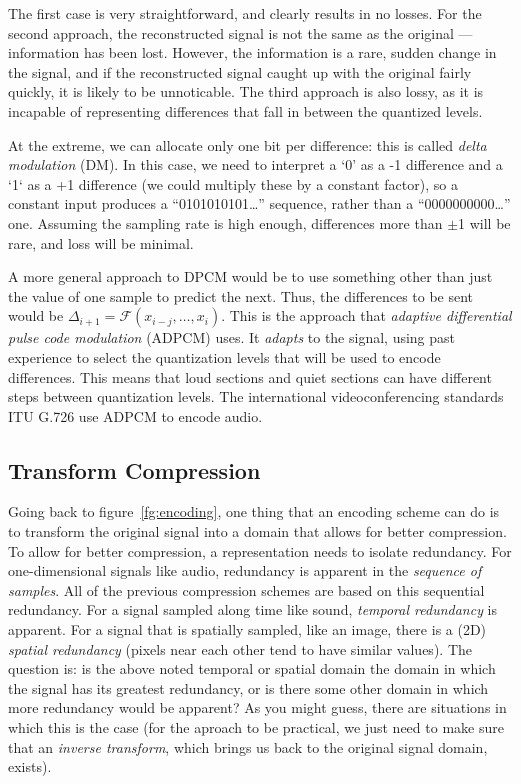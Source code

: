 The first case is very straightforward, and clearly results in no
losses.  For the second approach, the reconstructed signal is not the
same as the original --- information has been lost. However, the
information is a rare, sudden change in the signal, and if the
reconstructed signal caught up with the original fairly quickly, it is
likely to be unnoticable. The third approach is also lossy, as it is
incapable of representing differences that fall in between the
quantized levels.

At the extreme, we can allocate only one bit per difference: this is
called \emph{delta modulation} (DM).  In this case, we need to
interpret a `0' as a -1 difference and a `1` as a +1 difference (we
could multiply these by a constant factor), so a constant input
produces a ``0101010101\ldots'' sequence, rather than a
``0000000000\ldots'' one.  Assuming the sampling rate is high enough,
differences more than $\pm$1 will be rare, and loss will be minimal.

A more general approach to DPCM would be to use something other than
just the value of one sample to predict the next. Thus, the
differences to be sent would be $\Delta_{i+1} = \mathcal{F}(x_{i-j},
\ldots, x_i)$.  This is the approach that \emph{adaptive differential
pulse code modulation} (ADPCM) uses.  It \emph{adapts} to the signal,
using past experience to select the quantization levels that will be
used to encode differences.  This means that loud sections and quiet
sections can have different steps between quantization levels.  The
international videoconferencing standards ITU G.726 use ADPCM to
encode audio.

\subsection{Transform Compression}

Going back to figure~\ref{fg:encoding}, one thing that an encoding
scheme can do is to transform the original signal into a domain that
allows for better compression. To allow for better compression, a
representation needs to isolate redundancy. For one-dimensional
signals like audio, redundancy is apparent in the \emph{sequence of
samples}.  All of the previous compression schemes are based on this
sequential redundancy. For a signal sampled along time like sound,
\emph{temporal redundancy} is apparent. For a signal that is spatially
sampled, like an image, there is a (2D) \emph{spatial redundancy}
(pixels near each other tend to have similar values).  The question
is: is the above noted temporal or spatial domain the domain in which
the signal has its greatest redundancy, or is there some other domain
in which more redundancy would be apparent? As you might guess, there
are situations in which this is the case (for the aproach to be
practical, we just need to make sure that an \emph{inverse transform},
which brings us back to the original signal domain, exists).

